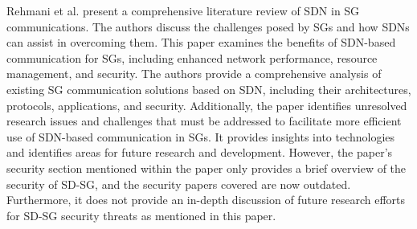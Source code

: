 \documentclass[conference]{IEEEtran}
\begin{document}
Rehmani et al. \cite{rehmani2019software} present a comprehensive literature review of SDN in SG communications. The authors discuss the challenges posed by SGs and how SDNs can assist in overcoming them. This paper examines the benefits of SDN-based communication for SGs, including enhanced network performance, resource management, and security. The authors provide a comprehensive analysis of existing SG communication solutions based on SDN, including their architectures, protocols, applications, and security. Additionally, the paper identifies unresolved research issues and challenges that must be addressed to facilitate more efficient use of SDN-based communication in SGs. It provides insights into technologies and identifies areas for future research and development. However, the paper's security section mentioned within the paper only provides a brief overview of the security of SD-SG, and the security papers covered are now outdated. Furthermore, it does not provide an in-depth discussion of future research efforts for SD-SG security threats as mentioned in this paper.
\end{document}
